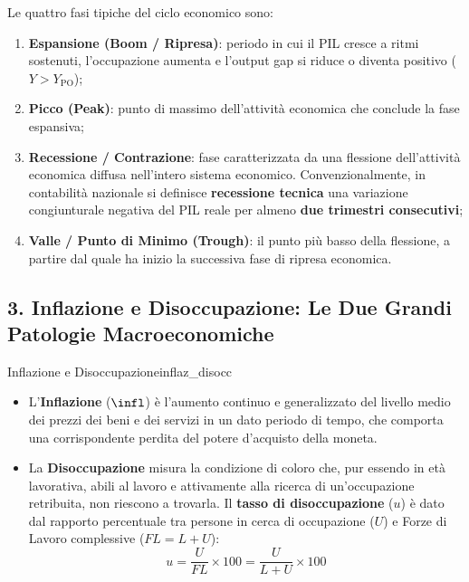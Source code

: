 Le quattro fasi tipiche del ciclo economico sono:
\begin{enumerate}
    \item \textbf{Espansione (Boom / Ripresa)}: periodo in cui il PIL cresce a ritmi sostenuti, l'occupazione aumenta e l'output gap si riduce o diventa positivo ($Y > Y_{\mathrm{PO}}$);
    \item \textbf{Picco (Peak)}: punto di massimo dell'attività economica che conclude la fase espansiva;
    \item \textbf{Recessione / Contrazione}: fase caratterizzata da una flessione dell'attività economica diffusa nell'intero sistema economico. Convenzionalmente, in contabilità nazionale si definisce \textbf{recessione tecnica} una variazione congiunturale negativa del PIL reale per almeno \textbf{due trimestri consecutivi};
    \item \textbf{Valle / Punto di Minimo (Trough)}: il punto più basso della flessione, a partire dal quale ha inizio la successiva fase di ripresa economica.
\end{enumerate}

\subsection{3. Inflazione e Disoccupazione: Le Due Grandi Patologie Macroeconomiche}

\begin{definizione}{Inflazione e Disoccupazione}{inflaz_disocc}
\begin{itemize}
    \item L'\textbf{Inflazione} ($\infl$) è l'aumento continuo e generalizzato del livello medio dei prezzi dei beni e dei servizi in un dato periodo di tempo, che comporta una corrispondente perdita del potere d'acquisto della moneta.
    \item La \textbf{Disoccupazione} misura la condizione di coloro che, pur essendo in età lavorativa, abili al lavoro e attivamente alla ricerca di un'occupazione retribuita, non riescono a trovarla. Il \textbf{tasso di disoccupazione} ($u$) è dato dal rapporto percentuale tra persone in cerca di occupazione ($U$) e Forze di Lavoro complessive ($FL = L + U$):
    \begin{equation}
        u = \frac{U}{FL} \times 100 = \frac{U}{L + U} \times 100
    \end{equation}
\end{itemize}
\end{definizione}

